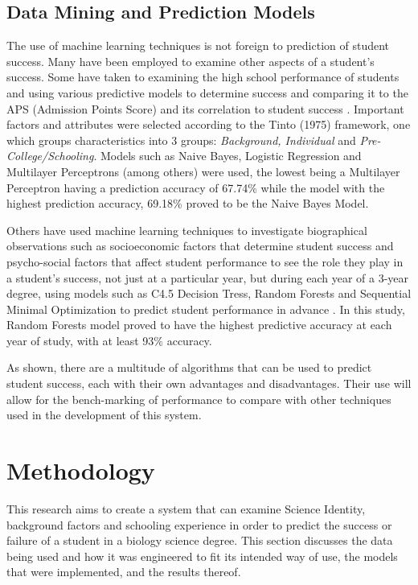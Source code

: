 \documentclass[conference]{IEEEtran}
\begin{document}
\subsection{Data Mining and Prediction Models}

The use of machine learning techniques is not foreign to prediction of student success. Many have been employed to examine other aspects of a student’s success. Some have taken to examining the high school performance of students and using various predictive models to determine success and comparing it to the APS (Admission Points Score) and its correlation to student success \cite{b10}. Important factors and attributes were selected according to the Tinto (1975) framework, one which groups characteristics into 3 groups: \textit{Background, Individual} and \textit{Pre-College/Schooling}. Models such as Naive Bayes, Logistic Regression and Multilayer Perceptrons (among others) were used, the lowest being a Multilayer Perceptron having a prediction accuracy of 67.74\% while the model with the highest prediction accuracy, 69.18\% proved to be the Naive Bayes Model.

Others have used machine learning techniques to investigate biographical observations such as socioeconomic factors that determine student success and psycho-social factors that affect student performance to see the role they play in a student’s success, not just at a particular year, but during each year of a 3-year degree, using models such as C4.5 Decision Tress, Random Forests and Sequential Minimal Optimization to predict student performance in advance \cite{b11}. In this study, Random Forests model proved to have the highest predictive accuracy at each year of study, with at least 93\% accuracy. 

As shown, there are a multitude of algorithms that can be used to predict student success, each with their own advantages and disadvantages. Their use will allow for the bench-marking of performance to compare with other techniques used in the development of this system.

\section{Methodology}

This research aims to create a system that can examine Science Identity, background factors and schooling experience in order to predict the success or failure of a student in a biology science degree. This section discusses the data being used and how it was engineered to fit its intended way of use, the models that were implemented, and the results thereof.
\end{document}
